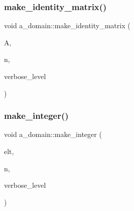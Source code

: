 \mbox{\label{classa__domain_ac0b9a2c9b835da684018c60ccb824d3e}} 
\subsubsection{\texorpdfstring{make\+\_\+identity\+\_\+matrix()}{make\_identity\_matrix()}}
{\footnotesize\ttfamily void a\+\_\+domain\+::make\+\_\+identity\+\_\+matrix (\begin{DoxyParamCaption}\item[{\mbox{\hyperlink{galois_8h_a09fddde158a3a20bd2dcadb609de11dc}{I\+NT}} $\ast$}]{A,  }\item[{\mbox{\hyperlink{galois_8h_a09fddde158a3a20bd2dcadb609de11dc}{I\+NT}}}]{n,  }\item[{\mbox{\hyperlink{galois_8h_a09fddde158a3a20bd2dcadb609de11dc}{I\+NT}}}]{verbose\+\_\+level }\end{DoxyParamCaption})}

\mbox{\label{classa__domain_aa2df348536ab3b2a701a9bf287c2f248}} 
\subsubsection{\texorpdfstring{make\+\_\+integer()}{make\_integer()}}
{\footnotesize\ttfamily void a\+\_\+domain\+::make\+\_\+integer (\begin{DoxyParamCaption}\item[{\mbox{\hyperlink{galois_8h_a09fddde158a3a20bd2dcadb609de11dc}{I\+NT}} $\ast$}]{elt,  }\item[{\mbox{\hyperlink{galois_8h_a09fddde158a3a20bd2dcadb609de11dc}{I\+NT}}}]{n,  }\item[{\mbox{\hyperlink{galois_8h_a09fddde158a3a20bd2dcadb609de11dc}{I\+NT}}}]{verbose\+\_\+level }\end{DoxyParamCaption})}

\mbox{\label{classa__domain_a6929066f012b2089349774888e665db2}} 
